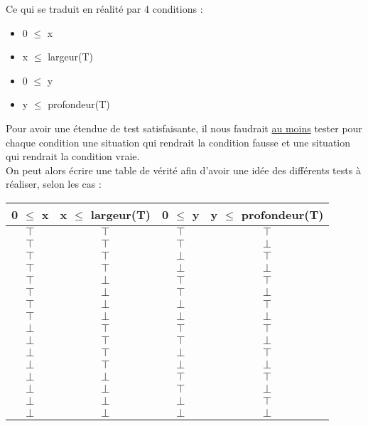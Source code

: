 \documentclass[a4paper, 11pt, notitlepage]{article}
\begin{document}
Ce qui se traduit en réalité par 4 conditions :
\begin{itemize}
\item 0 $\le$ x 
\item x $\le$ largeur(T)
\item 0 $\le$ y
\item y $\le$ profondeur(T) \\
 
 \end{itemize} 
 

 Pour avoir une étendue de test satisfaisante, il nous faudrait \underline{au moins} tester pour chaque condition une situation qui rendrait la condition fausse et une situation qui rendrait la condition vraie. \\
 
 On peut alors écrire une table de vérité afin d'avoir une idée des différents tests à réaliser, selon les cas :
 
 \begin{center}
   \begin{tabular}{ | c | c | c | c |}
     \hline
     0 $\le$ x &  x $\le$ largeur(T) & 0 $\le$ y &  y $\le$ profondeur(T) \\ \hline
    $\top$ & $\top$ & $\top$ & $\top$ \\ \hline
    $\top$ & $\top$ & $\top$ & $\bot$ \\ \hline
    $\top$ & $\top$ & $\bot$ & $\top$ \\ \hline
    $\top$ & $\top$ & $\bot$ & $\bot$ \\ \hline
    $\top$ & $\bot$ & $\top$ & $\top$ \\ \hline
    $\top$ & $\bot$ & $\top$ & $\bot$ \\ \hline
    $\top$ & $\bot$ & $\bot$ & $\top$ \\ \hline
    $\top$ & $\bot$ & $\bot$ & $\bot$ \\ \hline
    
    $\bot$ & $\top$ & $\top$ & $\top$ \\ \hline
    $\bot$ & $\top$ & $\top$ & $\bot$ \\ \hline
    $\bot$ & $\top$ & $\bot$ & $\top$ \\ \hline
    $\bot$ & $\top$ & $\bot$ & $\bot$ \\ \hline
    $\bot$ & $\bot$ & $\top$ & $\top$ \\ \hline
    $\bot$ & $\bot$ & $\top$ & $\bot$ \\ \hline
    $\bot$ & $\bot$ & $\bot$ & $\top$ \\ \hline
    $\bot$ & $\bot$ & $\bot$ & $\bot$ \\ \hline

   \end{tabular}
 \end{center}
\end{document}
